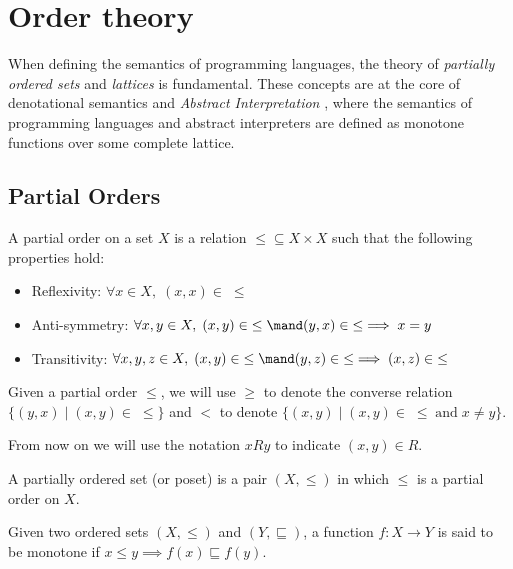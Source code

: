 \section{Order theory}\label{sec:backround:order_theory}

When defining the semantics of programming languages, the theory of 
\textit{partially ordered sets} and \textit{lattices} is fundamental. These 
concepts are at the core of denotational semantics \cite{Scott70} and 
\textit{Abstract Interpretation} \cite{Cousot77}, where the semantics of 
programming languages and abstract interpreters are defined as monotone 
functions over some complete lattice.

\subsection{Partial Orders}

\begin{definition}
  A partial order on a set $X$ is a relation $\leq \subseteq X \times X$ 
  such that the following properties hold:
  \begin{itemize}
    \item Reflexivity: $\forall x \in X, \; (x, x) \in \; \leq$
    \item Anti-symmetry: $\forall x, y \in X, \; (x, y) \in \; \leq \mand
      (y, x) \in \; \leq \implies x = y$
    \item Transitivity: $\forall x, y, z \in X, \; (x, y) \in \; \leq \mand 
      (y, z) \in \; \leq \implies (x, z) \in \;\leq$
  \end{itemize}
    
\end{definition}

Given a partial order $\leq$, we will use $\geq$ to denote the converse 
relation $\{ (y, x) \mid (x, y) \in \;\leq \}$ and $<$ to denote 
$\{ (x, y) \mid (x, y) \in \;\leq \; \text{and} \; x \neq y \}$.

From now on we will use the notation $x R y$ to indicate $(x, y) \in R$.

\begin{definition}
  A partially ordered set (or poset) is a pair $(X, \leq)$ in which $\leq$ is a 
  partial order on $X$.
\end{definition}

\begin{definition}
  Given two ordered sets $(X, \leq)$ and $(Y, \sqsubseteq)$, a function 
  $f : X \to Y$ is said to be monotone if $x \leq y \implies f(x) \sqsubseteq 
  f(y)$.
\end{definition}

